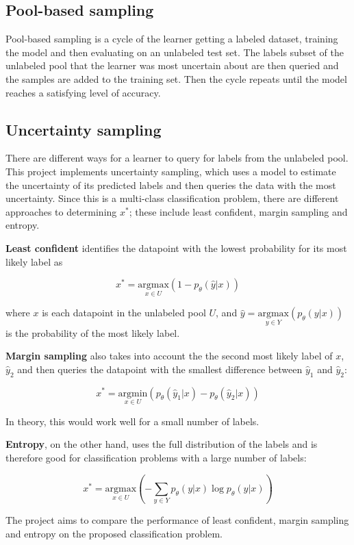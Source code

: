\documentclass[12pt,fleqn]{article}
\begin{document}
\begin{multicols}{2}
		
		\subsection{Pool-based sampling}
		Pool-based sampling is a cycle of the learner getting a labeled dataset, training the model and then evaluating on an unlabeled test set. The labels subset of the unlabeled pool that the learner was most uncertain about are then queried and the samples are added to the training set. Then the cycle repeats until the model reaches a satisfying level of accuracy.  
		
		\subsection{Uncertainty sampling}
		There are different ways for a learner to query for labels from the unlabeled pool. This project implements uncertainty sampling, which uses a model to estimate the uncertainty of its predicted labels and then queries the data with the most uncertainty. Since this is a multi-class classification problem, there are different approaches to determining $x^*$; these include least confident, margin sampling and entropy. 
		
		\textbf{Least confident} identifies the datapoint with the lowest probability for its most likely label as
		
		$$x^*=\underset{x\in U}{\text{argmax}}(1-p_\theta(\hat{y}|x))$$ 
		
		where $x$ is each datapoint in the unlabeled pool $U$, and $\hat{y}=\underset{y\in Y}{\text{argmax}}(p_\theta(y|x))$ is the probability of the most likely label. 
		
		\textbf{Margin sampling} also takes into account the the second most likely label of $x$, $\hat{y}_2$ and then queries the datapoint with the smallest difference between $\hat{y}_1$ and $\hat{y}_2$:
		
		$$x^*=\underset{x\in U}{\text{argmin}}(p_\theta(\hat{y}_1|x)-p_\theta(\hat{y}_2|x))$$
		
		In theory, this would work well for a small number of labels. 
		
		\textbf{Entropy}, on the other hand, uses the full distribution of the labels and is therefore good for classification problems with a large number of labels:
		
		$$x^*=\underset{x\in U}{\text{argmax}}\left(-\sum_{y\in Y}p_\theta(y|x)\log p_\theta(y|x)\right)$$
		 
		The project aims to compare the performance of least confident, margin sampling and entropy on the proposed classification problem. 
		 
	\end{multicols}		
\end{document}
